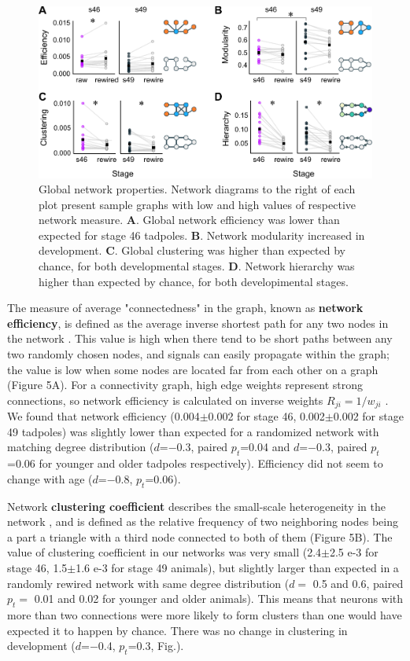 \documentclass{article}
\begin{document}
\begin{figure}[t!]
\includegraphics[width=\linewidth]{fig5.pdf}
\caption{
Global network properties. Network diagrams to the right of each plot present sample graphs with low and high values of respective network measure. \textbf{A}. Global network efficiency was lower than expected for stage 46 tadpoles. \textbf{B}. Network modularity increased in development. \textbf{C}. Global clustering was higher than expected by chance, for both developmental stages. \textbf{D}. Network hierarchy was higher than expected by chance, for both developimental stages. }
\end{figure}

The measure of average "connectedness" in the graph, known as \textbf{network efficiency}, is defined as the average inverse shortest path for any two nodes in the network \citep{latora2001efficiency}. This value is high when there tend to be short paths between any two randomly chosen nodes, and signals can easily propagate within the graph; the value is low when some nodes are located far from each other on a graph (Figure 5A). For a connectivity graph, high edge weights represent strong connections, so network efficiency is calculated on inverse weights $R_{ji} = 1/w_{ji}$ \citep{rubinov2010toolbox}. We found that network efficiency (0.004$\pm$0.002 for stage 46, 0.002$\pm$0.002 for stage 49 tadpoles) was slightly lower than expected for a randomized network with matching degree distribution ($d$=$-$0.3, paired $p_t$=0.04 and $d$=$-$0.3, paired $p_t$=0.06 for younger and older tadpoles respectively). Efficiency did not seem to change with age ($d$=$-$0.8, $p_t$=0.06).

Network \textbf{clustering coefficient} describes the small-scale heterogeneity in the network \citep{fagiolo2007}, and is defined as the relative frequency of two neighboring nodes being a part a triangle with a third node connected to both of them (Figure 5B). The value of clustering coefficient in our networks was very small (2.4$\pm$2.5 e-3 for stage 46, 1.5$\pm$1.6 e-3 for stage 49 animals), but slightly larger than expected in a randomly rewired network with same degree distribution ($d=$ 0.5 and 0.6, paired $p_t=$ 0.01 and 0.02 for younger and older animals). This means that neurons with more than two connections were more likely to form clusters than one would have expected it to happen by chance. There was no change in clustering in development ($d$=$-$0.4, $p_t$=0.3, Fig.).
\end{document}
